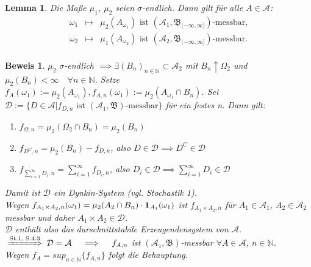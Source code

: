 \documentclass[a4paper,11pt]{book}
\newcommand{\N}{{\mathbb N}}
\newcommand{\ind}{\text{\bf{1}}}
\def\AA{ \mathcal{A} }
\def\BB{ \mathfrak{B} }
\def\folgt{\ensuremath{\implies}}
\newcommand{\folgtnach}[1]{\ensuremath{\DOTSB\;\xRightarrow{\text{#1}}\;}}
\newtheorem{Lem}[Sa]{Lemma}
\theoremstyle{nonumberplain}
\newtheorem{Bew}{Beweis}
\begin{document}
\begin{Lem} Die Maße $\mu_1$, $\mu_2$ seien $\sigma$-endlich. Dann gilt für alle $A\in\AA$: \\
\begin{eqnarray*}
\omega_1 & \mapsto & \mu_2(A_{\omega_1}) \text{ ist } (\AA_1,\BB_{(-\infty,\infty]})\text{-messbar,} \\
\omega_2 & \mapsto & \mu_1(A_{\omega_2}) \text{ ist } (\AA_2,\BB_{(-\infty,\infty]})\text{-messbar.} \\
\end{eqnarray*}
\end{Lem}
\begin{Bew} $\mu_2$ $\sigma$-endlich $\folgt \exists (B_n)_{n\in\N}\subset\AA_2$ mit $B_n\uparrow\Omega_2$ und $\mu_2(B_n)<\infty\quad\forall n\in\N$. Setze $f_A(\omega_1):=\mu_2(A_{\omega_1}), f_{A,n}(\omega_1):=\mu_2(A_{\omega_1}\cap B_n)$. Sei $\mathcal{D}:=\{D\in\AA|f_{D,n}\text{ ist }(\AA_1,\BB)\text{-messbar}\}$ für ein festes n. Dann gilt: \\
\begin{enumerate}
\item[(i)] $f_{\Omega,n}=\mu_2(\Omega_2\cap B_n)=\mu_2(B_n)$
\item[(ii)] $f_{D^C,n}=\mu_2(B_n) - f_{D,n}$, also $D\in\mathcal{D}\folgt D^C\in\mathcal{D}$
\item[(iii)] $f_{\sum_{i=1}^{\infty}D_i,n} = \sum_{i=1}^{\infty}f_{D_i,n}$, also $D_i\in\mathcal{D}\folgt\sum_{i=1}^{\infty}D_i\in\mathcal{D}$
\end{enumerate}
Damit ist $\mathcal{D}$ ein Dynkin-System (vgl. Stochastik 1). \\
Wegen $f_{A_1\times A_2,n}(\omega_1) = \mu_2(A_2\cap B_n)\cdot \ind_{A_1}(\omega_1)$ ist $f_{A_1\times A_2,n}$ für $A_1\in\AA_1$, $A_2\in\AA_2$ messbar und daher $A_1\times A_2\in\mathcal{D}$. \\
$\mathcal{D}$ enthält also das durschnittstabile Erzeugendensystem von $\AA$. \\
$\folgtnach{St.1, S.4.3}\mathcal{D}=\AA \quad\folgt\quad f_{A,n}$ ist $(\AA_1,\BB)$-messbar $\forall A\in\AA$, $n\in\N$. \\
Wegen $f_A=sup_{n\in\N}\{f_{A,n}\}$ folgt die Behauptung.
\end{Bew}
\end{document}
